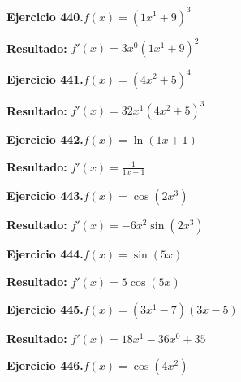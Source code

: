 \documentclass[10pt,a4paper]{article}
\begin{document}
\begin{ejbox}
\textbf{Ejercicio 440.}\quad $f(x) = (1x^{1} +9)^{3}$
\end{ejbox}

\begin{solbox}
\textbf{Resultado:} \(\displaystyle f'(x) = 3x^{0}(1x^{1} +9)^{2}\)
\end{solbox}

\begin{ejbox}
\textbf{Ejercicio 441.}\quad $f(x) = (4x^{2} +5)^{4}$
\end{ejbox}

\begin{solbox}
\textbf{Resultado:} \(\displaystyle f'(x) = 32x^{1}(4x^{2} +5)^{3}\)
\end{solbox}

\newpage
\begin{ejbox}
\textbf{Ejercicio 442.}\quad $f(x) = \ln(1x + 1)$
\end{ejbox}

\begin{solbox}
\textbf{Resultado:} \(\displaystyle f'(x) = \frac{1}{1x + 1}\)
\end{solbox}

\begin{ejbox}
\textbf{Ejercicio 443.}\quad $f(x) = \cos(2x^{3})$
\end{ejbox}

\begin{solbox}
\textbf{Resultado:} \(\displaystyle f'(x) = -6x^{2}\sin(2x^{3})\)
\end{solbox}

\begin{ejbox}
\textbf{Ejercicio 444.}\quad $f(x) = \sin(5x)$
\end{ejbox}

\begin{solbox}
\textbf{Resultado:} \(\displaystyle f'(x) = 5\cos(5x)\)
\end{solbox}

\newpage
\begin{ejbox}
\textbf{Ejercicio 445.}\quad $f(x) = (3x^{1} -7)(3x -5)$
\end{ejbox}

\begin{solbox}
\textbf{Resultado:} \(\displaystyle f'(x) = 18x^{1} -36x^{0} +35\)
\end{solbox}

\begin{ejbox}
\textbf{Ejercicio 446.}\quad $f(x) = \cos(4x^{2})$
\end{ejbox}
\end{document}
